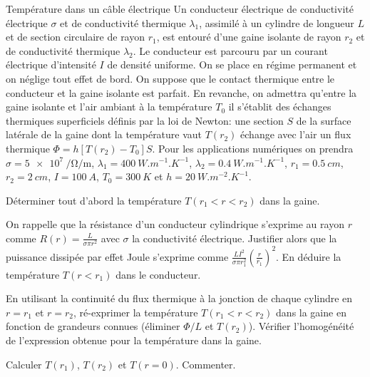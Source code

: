 \begin{exo}[PC]{Température dans un câble électrique}
Un conducteur électrique de conductivité électrique $\sigma$ et de conductivité thermique $\lambda_1$, assimilé à un cylindre de longueur $L$ et de section circulaire de rayon $r_1$, est entouré d'une gaine isolante de rayon $r_2$ et de conductivité thermique $\lambda_2$. Le conducteur est parcouru par un courant électrique d'intensité $I$ de densité uniforme.
%
On se place en régime permanent et on néglige tout effet de bord. On suppose que le contact thermique entre le conducteur et la gaine isolante est parfait. En revanche, on admettra qu'entre la gaine isolante et l'air ambiant à la température $T_0$ il s'établit des échanges thermiques superficiels définis par la loi de Newton: une section $S$ de la surface latérale de la gaine dont la température vaut $T(r_2)$ échange avec l'air un flux thermique $\Phi=h\left[T(r_2)-T_0\right]S$.
%
Pour les applications numériques on prendra $\sigma=\SI{5e7}{\per\ohm\per\meter}$, $\lambda_1=\SI{400}{W.m^{-1}.K^{-1}}$, $\lambda_2=\SI{0,4}{W.m^{-1}.K^{-1}}$, $r_1=\SI{0,5}{cm}$, $r_2=\SI{2}{cm}$,
$I=\SI{100}{A}$, $T_0=\SI{300}{K}$ et $h=\SI{20}{W.m^{-2}.K^{-1}}$.

\begin{quest}
\item Déterminer tout d'abord la température $T(r_1<r<r_2)$ dans la gaine.
\item On rappelle que la résistance d'un conducteur cylindrique s'exprime au rayon $r$ comme $R(r)=\frac{L}{\sigma \pi r^2}$ avec $\sigma$ la conductivité électrique. Justifier alors que la puissance dissipée par effet Joule s'exprime comme $\frac{LI^2}{\sigma\pi r_1^2}\left(\frac{r}{r_1}\right)^2$. En déduire la température $T(r<r_1)$ dans le conducteur.
\item En utilisant la continuité du flux thermique à la jonction de chaque cylindre en $r=r_1$ et $r=r_2$, ré-exprimer la température $T(r_1<r<r_2)$ dans la gaine en fonction de grandeurs connues (éliminer $\Phi/L$ et $T(r_2)$). Vérifier l'homogénéité de l'expression obtenue pour la température dans la gaine.
\item Calculer $T(r_1)$, $T(r_2)$ et $T(r=0)$. Commenter.
\end{quest}
\end{exo}

